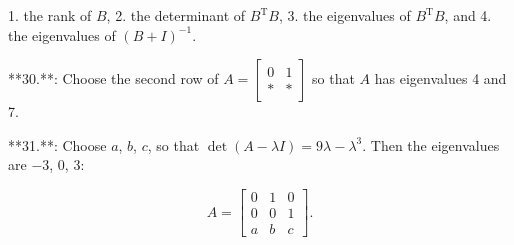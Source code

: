 1. the rank of \(B\),
2. the determinant of \(B^{\mathrm{T}}B\),
3. the eigenvalues of \(B^{\mathrm{T}}B\), and
4. the eigenvalues of \((B+I)^{-1}\).

**30.**: Choose the second row of \(A=[\begin{smallmatrix}0&1\\ *&*\end{smallmatrix}]\) so that \(A\) has eigenvalues 4 and 7.

**31.**: Choose \(a\), \(b\), \(c\), so that \(\det(A-\lambda I)=9\lambda-\lambda^{3}\). Then the eigenvalues are \(-3\), 0, 3:

\[A=\begin{bmatrix}0&1&0\\ 0&0&1\\ a&b&c\end{bmatrix}.\] 